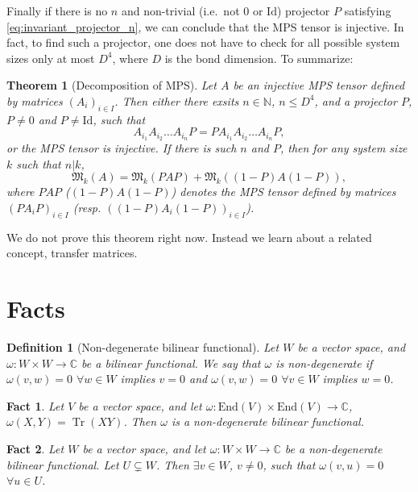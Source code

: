 \documentclass{article}
\newtheorem{fact}{Fact}
\newtheorem{theorem}{Theorem}
\newtheorem{definition}{Definition}
\newcommand{\tr}{\operatorname{Tr}}
\newcommand{\id}{\mathrm{Id}}
\newcommand{\End}{\mathrm{End}}
\begin{document}
Finally if there is no $n$ and non-trivial (i.e.\ not $0$ or $\id$) projector $P$ satisfying \cref{eq:invariant_projector_n}, we can conclude that the MPS tensor is injective. In fact, to find such a projector, one does not have to check for all possible system sizes only at most $D^4$, where $D$ is the bond dimension. To summarize:
\begin{theorem}[Decomposition of MPS]
  Let $A$ be an injective MPS tensor defined by matrices $(A_i)_{i\in I}$. Then either there exsits $n\in \mathbb{N}$, $n\leq D^4$, and a projector $P$, $P\neq 0$ and $P\neq \id$, such that 
  \begin{equation*}
    A_{i_1} A_{i_2} \dots A_{i_n} P = P  A_{i_1} A_{i_2} \dots A_{i_n} P, 
  \end{equation*}
  or the MPS tensor is injective. If there is such $n$ and $P$, then for any system size $k$ such that $n|k$, 
  \begin{equation*}
    \mathfrak{M}_k(A) =     \mathfrak{M}_k(PAP) +     \mathfrak{M}_k((1-P)A(1-P)),
  \end{equation*} 
  where $PAP$ ($(1-P)A(1-P)$) denotes the MPS tensor defined by matrices $(PA_iP)_{i\in I}$ (resp. $((1-P)A_i(1-P))_{i\in I}$).  
\end{theorem}

We do not prove this theorem right now. Instead we learn about a related concept, transfer matrices.



\appendix

\section{Facts}

\begin{definition}[Non-degenerate bilinear functional]\label{def:nondegen_bili_fcnl}
  Let $W$ be a vector space, and $\omega: W\times W\to \mathbb{C}$ be a bilinear functional.
  We say that $\omega$ is non-degenerate if $\omega(v,w) = 0$ $\forall w\in W$ implies $v=0$ and $\omega(v,w) = 0$ $\forall v\in W$ implies $w=0$.
\end{definition}

\begin{fact}\label{fact:tr_nondegen}
  Let $V$ be a vector space, and let $\omega: \End(V)\times\End(V)\to \mathbb{C}$, $\omega(X,Y)= \tr(XY)$. Then $\omega$ is a non-degenerate bilinear functional.
\end{fact}


\begin{fact}
  Let $W$ be a vector space, and let $\omega: W\times W\to \mathbb{C}$ be a non-degenerate bilinear functional. Let $U\subsetneq W$. Then $\exists v\in W$, $v\neq 0$, such that  $\omega(v,u) =0$ $\forall u\in U$.
\end{fact}
\end{document}
